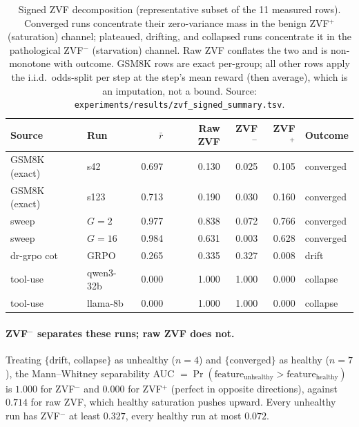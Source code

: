 \begin{table}[htbp]
\centering
\small
\setlength{\tabcolsep}{4pt}
\begin{tabular}{llrrrrl}
\hline
Source & Run & $\bar r$ & Raw ZVF & ZVF$^-$ & ZVF$^+$ & Outcome \\
\hline
GSM8K (exact)   & s42      & 0.697 & 0.130 & 0.025 & 0.105 & converged \\
GSM8K (exact)   & s123     & 0.713 & 0.190 & 0.030 & 0.160 & converged \\
sweep           & $G{=}2$  & 0.977 & 0.838 & 0.072 & 0.766 & converged \\
sweep           & $G{=}16$ & 0.984 & 0.631 & 0.003 & 0.628 & converged \\
dr-grpo cot     & GRPO     & 0.265 & 0.335 & 0.327 & 0.008 & drift \\
tool-use        & qwen3-32b& 0.000 & 1.000 & 1.000 & 0.000 & collapse \\
tool-use        & llama-8b & 0.000 & 1.000 & 1.000 & 0.000 & collapse \\
\hline
\end{tabular}
\caption{Signed ZVF decomposition (representative subset of the 11 measured rows).
Converged runs concentrate their zero-variance mass in the benign
ZVF$^+$ (saturation) channel; plateaued, drifting, and collapsed runs
concentrate it in the pathological ZVF$^-$ (starvation) channel. Raw ZVF
conflates the two and is non-monotone with outcome. GSM8K rows are exact
per-group; all other rows apply the i.i.d.\ odds-split per step at the step's
mean reward (then average), which is an imputation, not a bound. Source:
\texttt{experiments/results/zvf\_signed\_summary.tsv}.}
\label{tab:zvf-signed}
\end{table}

\paragraph{ZVF$^-$ separates these runs; raw ZVF does not.}
Treating $\{$drift, collapse$\}$ as unhealthy ($n{=}4$) and $\{$converged$\}$ as
healthy ($n{=}7$), the Mann--Whitney separability
AUC $=\Pr(\text{feature}_{\text{unhealthy}}{>}\text{feature}_{\text{healthy}})$
is $1.000$ for ZVF$^-$ and $0.000$ for ZVF$^+$ (perfect in opposite directions),
against $0.714$ for raw ZVF, which healthy saturation pushes upward. Every
unhealthy run has ZVF$^-$ at least $0.327$, every healthy run at most $0.072$.

